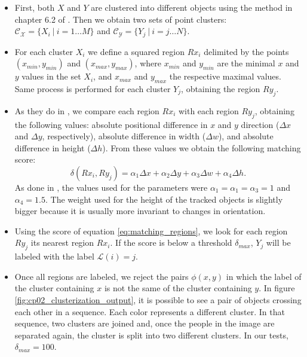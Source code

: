 \begin{itemize}
 \item First, both $X$ and $Y$ are clustered into different objects using the method in chapter 6.2 of 
\cite{rusu2009semantic}. Then we obtain two sets of point clusters: $\mathcal{C_X} = \{ X_i ~|~ i=1 \dots M \}$ 
and $\mathcal{C_Y} = \{ Y_j ~|~ i=j \dots N \}$.
 \item For each cluster $X_i$ we define a squared region $Rx_i$ delimited by the points $(x_{min}, y_{min})$ and $(x_{max}, y_{max})$, where $x_{min}$ and $y_{min}$ are the minimal $x$ and $y$ values in the set $X_i$, and $x_{max}$ and $y_{max}$ the respective maximal values. Same process is performed for each cluster $Y_j$, obtaining the region $Ry_j$.
 \item As they do in \cite{siebel2003design}, we compare each region $Rx_i$ with each region $Ry_j$, obtaining the following values: absolute positional difference in $x$ and $y$ direction ($\varDelta x$ and $\varDelta y$, respectively), absolute difference in width ($\varDelta w$), and absolute difference in height ($\varDelta h$). From these values we obtain the following matching score:
 \begin{equation}\label{eq:matching_regions}
  \delta (Rx_i, Ry_j) = \alpha_1 \varDelta x + \alpha_2 \varDelta y + \alpha_3 \varDelta w + \alpha_4 \varDelta h.
 \end{equation}
 As done in \cite{siebel2003design}, the values used for the parameters were $\alpha_1 = \alpha_1 = \alpha_3 = 1$ and $\alpha_4 = 1.5$. The weight used for the height of the tracked objects is slightly bigger because it is usually more invariant to changes in orientation.
 \item Using the score of equation \ref{eq:matching_regions}, we look for each region $Ry_j$ its nearest region $Rx_i$. 
If the score is below a threshold $\delta_{max}$, $Y_j$ will be labeled with the label $\mathcal{L}(i) = j$.
 \item Once all regions are labeled, we reject the pairs $\phi(x,y)$ in which the label of the cluster containing 
$x$ is not the same of the cluster containing $y$. In figure \ref{fig:cp02_clusterization_output}, it is possible to see a 
pair of objects crossing each other in a sequence. Each color represents a different cluster. In that sequence, two 
clusters are joined and, once the people in the image are separated again, the cluster is split into two 
different clusters. In our tests, $\delta_{max} = 100$.
\end{itemize}

